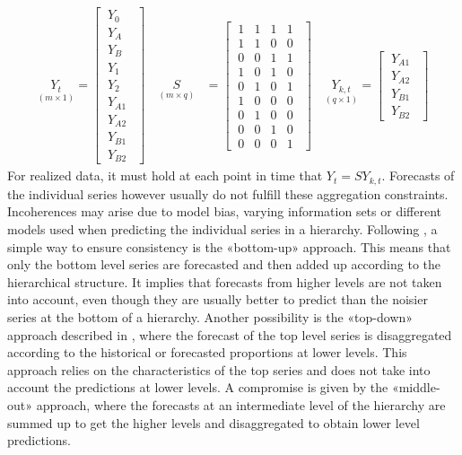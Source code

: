 \documentclass[a4paper,fleqn,11pt]{article}
\begin{document}
\begin{align*}
\underset{(m\times 1)}{Y_t} = \begin{bmatrix}
\ Y_0\ \ \\
\ Y_A\ \ \\
\ Y_B\ \ \\
\ Y_1\ \ \\
\ Y_2\ \ \\
\ Y_{A1}\ \ \\
\ Y_{A2}\ \ \\
\ Y_{B1}\ \ \\
\ Y_{B2}\ \ 
\end{bmatrix} \quad \underset{(m\times q)}{S} &=
\begin{bmatrix}
\ 1 & 1 & 1 & 1 \ \ \\
\ 1 & 1 & 0 & 0 \ \ \\
\ 0 & 0  & 1 & 1\ \ \\
\ 1 & 0 & 1 & 0 \ \ \\
\ 0 & 1 & 0 & 1\ \ \\
\ 1 & 0 & 0 & 0 \ \ \\
\ 0 & 1 & 0 & 0 \ \ \\
\ 0 & 0 & 1 & 0 \ \ \\
\ 0 & 0 & 0 & 1\ \ 
\end{bmatrix} \quad \underset{(q\times 1)}{Y_{k,t}} = \begin{bmatrix}
	\ Y_{A1}\ \ \\
	\ Y_{A2}\ \ \\
	\ Y_{B1}\ \ \\
	\ Y_{B2}\ \ 
\end{bmatrix} 
\end{align*}
For realized data, it must hold at each point in time that $Y_t = S Y_{k,t}$. Forecasts of the individual series however usually do not fulfill these aggregation constraints. Incoherences may arise due to model bias, varying information sets or different models used when predicting the individual series in a hierarchy. Following \cite{Gross1990}, a simple way to ensure consistency is the «bottom-up» approach. This means that only the bottom level series are forecasted and then added up according to the hierarchical structure. It implies that forecasts from higher levels are not taken into account, even though they are usually better to predict than the noisier series at the bottom of a hierarchy. Another possibility is the «top-down» approach described in \cite{Athanasopoulos2009}, where the forecast of the top level series is disaggregated according to the historical or forecasted proportions at lower levels. This approach relies on the characteristics of the top series and does not take into account the predictions at lower levels. A compromise is given by the «middle-out» approach, where the forecasts at an intermediate level of the hierarchy are summed up to get the higher levels and disaggregated to obtain lower level predictions.
\end{document}
